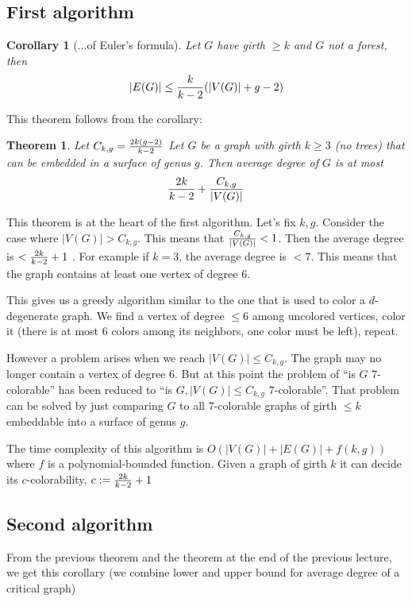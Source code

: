 \documentclass{article}
\newtheorem*{theorem}{Theorem}
\newtheorem*{corollary}{Corollary}
\begin{document}
\subsection*{First algorithm}

\begin{corollary}[...of Euler's formula]
	Let $G$ have girth $\ge k$ and $G$ not a forest, then
	$$ |E(G)| \le {k\over{k-2}}(|V(G)| + g - 2)$$
\end{corollary}

This theorem follows from the corollary:

\begin{theorem}
	Let $C_{k,g} = {{2k(g-2)}\over{k-2}}$ Let $G$ be a graph with girth $k
	\ge 3$ (no trees) that can be embedded in a surface of genus $g$. Then
	average degree of $G$ is at most $$ {{2k}\over{k-2}} +
	{C_{k,g}\over{|V(G)|}}$$
\end{theorem}

\noindent
This theorem is at the heart of the first algorithm. Let's fix $k,g$. Consider
the case where $|V(G)| > C_{k,g}$. This means that ${C_{k,g}\over{|V(G)|}} <
1$. Then the average degree is $< {{2k}\over{k-2}} + 1$ . For example if $k =
3$, the average degree is $< 7$. This means that the graph contains at least
one vertex of degree $6$.

This gives us a greedy algorithm similar to the one that is used to color a
$d$-degenerate graph. We find a vertex of degree $\le 6$ among uncolored
vertices, color it (there is at most $6$ colors among its neighbors, one color
must be left), repeat.

However a problem arises when we reach $|V(G)| \le C_{k,g}$. The graph may no
longer contain a vertex of degree $6$. But at this point the problem of
\enquote{is $G$ $7$-colorable} has been reduced to \enquote{is $G, |V(G)| \le
C_{k,g}$ $7$-colorable}. That problem can be solved by just comparing $G$ to
all $7$-colorable graphs of girth $\le k$ embeddable into a surface of genus
$g$.

The time complexity of this algorithm is $O(|V(G)| + |E(G)| + f(k, g))$ where
$f$ is a polynomial-bounded function. Given a graph of girth $k$ it can decide
its $c$-colorability, $c := {{2k}\over{k-2}} + 1$

\subsection*{Second algorithm}

From the previous theorem and the theorem at the end of the previous lecture,
we get this corollary (we combine lower and upper bound for average degree of a
critical graph)
\end{document}
